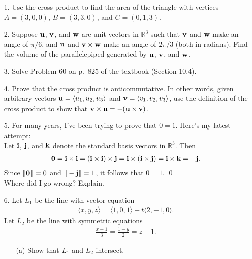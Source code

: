 \documentclass[reqno, 12pt]{amsart}
\newcommand{\R}{\mathbb R}
\begin{document}
\newpage
\begin{itemize}
\item[1.] Use the cross product to find the area of the triangle with vertices $A = (3,0,0)$, $B = (3,3,0)$, and $C = (0,1,3)$.

\vspace{4 in}

\item[2.] Suppose ${\bf u}$, ${\bf v}$, and ${\bf w}$ are unit vectors in $\R^3$ such that ${\bf v}$ and ${\bf w}$ make an angle of $\pi/6$, and ${\bf u}$ and ${\bf v}\times{\bf w}$ make an angle of $2\pi/3$ (both in radians). Find the volume of the parallelepiped generated by ${\bf u}$, ${\bf v}$, and ${\bf w}$.

\newpage
\item[3.] Solve Problem 60 on p.~825 of the textbook (Section 10.4).

\vspace{4 in}
\item[4.] Prove that the cross product is anticommutative. In other words, given arbitrary vectors ${\bf u} = \langle u_1,u_2,u_3\rangle$ and ${\bf v} = \langle v_1,v_2,v_3\rangle$, use the definition of the cross product to show that ${\bf v} \times {\bf u} = -({\bf u} \times {\bf v})$.

\newpage
\item[5.] For many years, I've been trying to prove that $0 = 1$. Here's my latest attempt:\\

Let ${\bf i}$, ${\bf j}$, and ${\bf k}$ denote the standard basis vectors in $\R^3$. Then
\begin{align*}
{\bf 0} = {\bf i} \times {\bf i} = ({\bf i} \times {\bf i}) \times {\bf j} = {\bf i} \times ({\bf i} \times {\bf j}) = {\bf i} \times {\bf k} = -{\bf j}.
\end{align*}
Since $\|{\bf 0}\| = 0$ and $\|-{\bf j}\| = 1$, it follows that $0 = 1$. \qed\\

Where did I go wrong? Explain.

\vspace{2.5 in}
\item[6.] Let $L_1$ be the line with vector equation
\begin{align*}
\langle x,y,z\rangle = \langle 1,0,1\rangle + t\langle 2,-1,0\rangle.
\end{align*}
Let $L_2$ be the line with symmetric equations
\begin{align*}
\frac{x+1}{3} = \frac{1-y}{2} = z-1.
\end{align*}
\begin{enumerate}
\item[(a)]{Show that $L_1$ and $L_2$ intersect.}


\end{enumerate}
\end{itemize}
\end{document}
